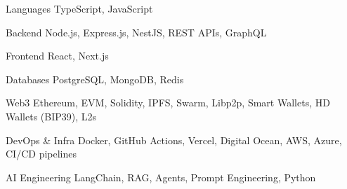 
\begin{cvskills}

\cvskill
{Languages}
{TypeScript, JavaScript}

\cvskill
{Backend}
{Node.js, Express.js, NestJS, REST APIs, GraphQL}

\cvskill
{Frontend}
{React, Next.js}

\cvskill
{Databases}
{PostgreSQL, MongoDB, Redis}

\cvskill
{Web3}
{Ethereum, EVM, Solidity, IPFS, Swarm, Libp2p, Smart Wallets, HD Wallets (BIP39), L2s}

\cvskill
{DevOps \& Infra}
{Docker, GitHub Actions, Vercel, Digital Ocean, AWS, Azure, CI/CD pipelines}

\cvskill
{AI Engineering}
{LangChain, RAG, Agents, Prompt Engineering, Python}


\end{cvskills}

